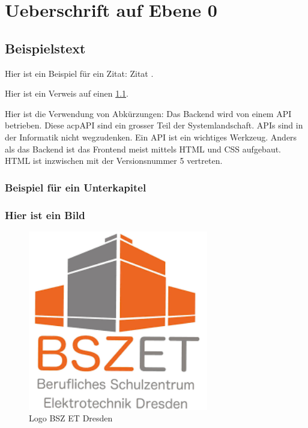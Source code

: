 \documentclass[a4paper,
    11pt,
    headings=small,
    ngerman,
    listof=totoc,
    index=totoc,
    numbers=noenddot]{scrreprt}[2021/11/13]
\begin{document}
\newpage



\newpage

\tableofcontents
\cleardoublepage

\newpage
\pagestyle{scrheadings}

\chapter{Ueberschrift auf Ebene 0}

\section{Beispielstext}\label{sec:bsp}

Hier ist ein Beispiel für ein Zitat: \glqq Zitat\grqq{} \cite{Bernhardi.1883}.

Hier ist ein Verweis auf einen \cref{sec:bsp}.

Hier ist die Verwendung von Abkürzungen: Das Backend wird von einem \ac{API} betrieben. Diese acp{API} sind ein grosser Teil der Systemlandschaft. \acp{API} sind in der Informatik nicht wegzudenken. Ein \ac{API} ist ein wichtiges Werkzeug. Anders als das Backend ist das Frontend meist mittels \ac{HTML} und \ac{CSS} aufgebaut. \ac{HTML} ist inzwischen mit der Versionsnummer 5 vertreten.

\subsection[Kurzbeschreibung]{Beispiel für ein Unterkapitel}

\newpage

\subsection{Hier ist ein Bild}

\begin{figure}[htbp]
  \centering
  \includegraphics[width=0.7\textwidth]{pics/bszet.png}
  \caption{Logo BSZ ET Dresden}
  \label{fig:logobszetdd}
\end{figure}
\end{document}
